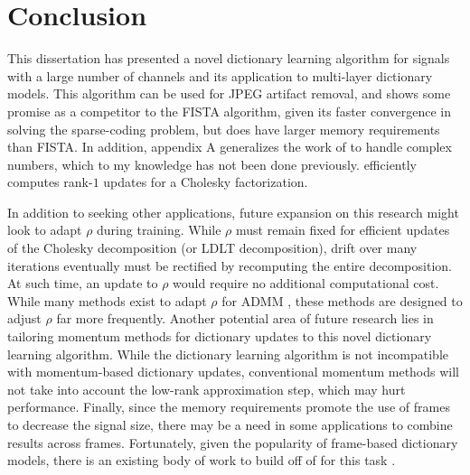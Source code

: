 \chapter{Conclusion}
This dissertation has presented a novel dictionary learning algorithm for signals with a large number of channels and its application to multi-layer dictionary models. This algorithm can be used for JPEG artifact removal, and shows some promise as a competitor to the FISTA algorithm, given its faster convergence in solving the sparse-coding problem, but does have larger memory requirements than FISTA. In addition, appendix A generalizes the work of \cite{krause2015more} to handle complex numbers, which to my knowledge has not been done previously. \cite{krause2015more} efficiently computes rank-$1$ updates for a Cholesky factorization.

In addition to seeking other applications, future expansion on this research might look to adapt $\rho$ during training. While $\rho$ must remain fixed for efficient updates of the Cholesky decomposition (or LDLT decomposition), drift over many iterations eventually must be rectified by recomputing the entire decomposition. At such time, an update to $\rho$ would require no additional computational cost. While many methods exist to adapt $\rho$ for ADMM \cite{he2000alternating}\cite{xu2017adaptive}, these methods are designed to adjust $\rho$ far more frequently. Another potential area of future research lies in tailoring momentum methods for dictionary updates to this novel dictionary learning algorithm. While the dictionary learning algorithm is not incompatible with momentum-based dictionary updates, conventional momentum methods \cite{sutskever2013importance}\cite{kingma2017adam} will not take into account the low-rank approximation step, which may hurt performance. Finally, since the memory requirements promote the use of frames to decrease the signal size, there may be a need in some applications to combine results across frames. Fortunately, given the popularity of frame-based dictionary models, there is an existing body of work to build off of for this task \cite{elad2006image}\cite{yang2010image}\cite{turquais2017method}\cite{jiang2021combining}.
